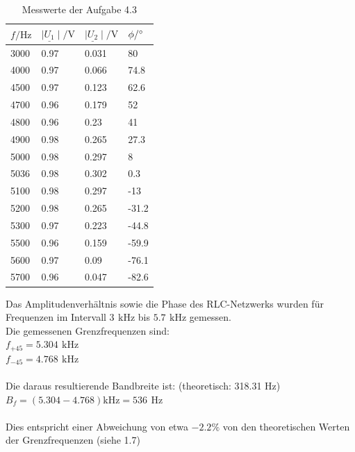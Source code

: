 \documentclass[a4paper, 12pt]{article}
\begin{document}
    \begin{table}[H]
    \begin{center}
    \begin{tabular}{|l|l|l|l|}
    \hline
    $f / \si{\hertz}$  & $ \mid \underline{U_1} \mid / \si{\volt}$   & $\mid \underline{U_2} \mid / \si{\volt}$ & $\phi / \degree$ \\
    \hline
    3000 & 0.97 & 0.031 & 80    \\
    4000 & 0.97 & 0.066 & 74.8  \\
    4500 & 0.97 & 0.123 & 62.6  \\
    4700 & 0.96 & 0.179 & 52    \\
    4800 & 0.96 & 0.23  & 41    \\
    4900 & 0.98 & 0.265 & 27.3  \\
    5000 & 0.98 & 0.297 & 8     \\
    5036 & 0.98 & 0.302 & 0.3   \\
    5100 & 0.98 & 0.297 & -13   \\
    5200 & 0.98 & 0.265 & -31.2 \\
    5300 & 0.97 & 0.223 & -44.8 \\
    5500 & 0.96 & 0.159 & -59.9 \\
    5600 & 0.97 & 0.09  & -76.1 \\
    5700 & 0.96 & 0.047 & -82.6 \\
    \hline
    \end{tabular}
    \end{center}
    \caption*{Messwerte der Aufgabe 4.3}
    \end{table}

    \noindent Das Amplitudenverhältnis sowie die Phase des RLC-Netzwerks wurden für Frequenzen im Intervall $ 3 \,\ \si{\kilo\hertz}$ bis $ 5.7\,\ \si{\kilo\hertz}$ gemessen.\\

    \noindent Die gemessenen Grenzfrequenzen sind:\\
    $f_{+45} = 5.304 \,\ \si{\kilo\hertz}$\\
    $f_{-45} = 4.768 \,\ \si{\kilo\hertz}$\\\\
    Die daraus resultierende Bandbreite ist: (theoretisch: 318.31 Hz)\\
    $B_f = (5.304 - 4.768) \si{\kilo\hertz} = 536 \,\ \si{\hertz}$\\\\

    \noindent Dies entspricht einer Abweichung von etwa $-2.2\%$ von den theoretischen Werten der Grenzfrequenzen (siehe 1.7)\\
\end{document}
